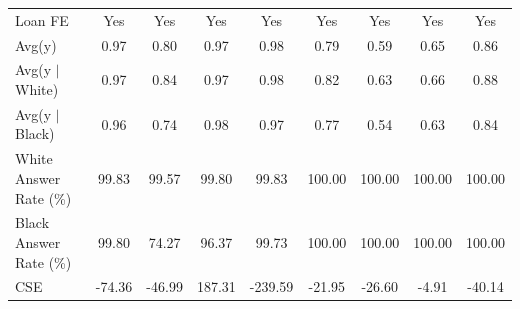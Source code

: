 {\begin{tabular}{l*{8}{c}}
Loan FE         &      Yes         &      Yes         &      Yes         &      Yes         &      Yes         &      Yes         &      Yes         &      Yes         \\
Avg(y)          &     0.97         &     0.80         &     0.97         &     0.98         &     0.79         &     0.59         &     0.65         &     0.86         \\
Avg(y $|$ White)&     0.97         &     0.84         &     0.97         &     0.98         &     0.82         &     0.63         &     0.66         &     0.88         \\
Avg(y $|$ Black)&     0.96         &     0.74         &     0.98         &     0.97         &     0.77         &     0.54         &     0.63         &     0.84         \\
White Answer Rate (\%)&    99.83         &    99.57         &    99.80         &    99.83         &   100.00         &   100.00         &   100.00         &   100.00         \\
Black Answer Rate (\%)&    99.80         &    74.27         &    96.37         &    99.73         &   100.00         &   100.00         &   100.00         &   100.00         \\
CSE             &   -74.36         &   -46.99         &   187.31         &  -239.59         &   -21.95         &   -26.60         &    -4.91         &   -40.14         \\
\bottomrule
\end{tabular}
}
